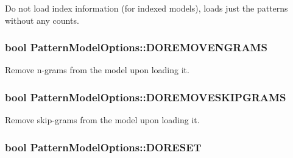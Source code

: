 Do not load index information (for indexed models), loads just the patterns without any counts. 

\hypertarget{classPatternModelOptions_a4ded839cdeb4f4191896d074ef45cf6e}{}
\subsubsection[{D\+O\+R\+E\+M\+O\+V\+E\+N\+G\+R\+A\+M\+S}]{\setlength{\rightskip}{0pt plus 5cm}bool Pattern\+Model\+Options\+::\+D\+O\+R\+E\+M\+O\+V\+E\+N\+G\+R\+A\+M\+S}\label{classPatternModelOptions_a4ded839cdeb4f4191896d074ef45cf6e}


Remove n-\/grams from the model upon loading it. 

\hypertarget{classPatternModelOptions_a88eb47abf2e38a2afac00e8cb9a7a869}{}
\subsubsection[{D\+O\+R\+E\+M\+O\+V\+E\+S\+K\+I\+P\+G\+R\+A\+M\+S}]{\setlength{\rightskip}{0pt plus 5cm}bool Pattern\+Model\+Options\+::\+D\+O\+R\+E\+M\+O\+V\+E\+S\+K\+I\+P\+G\+R\+A\+M\+S}\label{classPatternModelOptions_a88eb47abf2e38a2afac00e8cb9a7a869}


Remove skip-\/grams from the model upon loading it. 

\hypertarget{classPatternModelOptions_a52b76b6c81b7666c997ca05bc1df7e97}{}
\subsubsection[{D\+O\+R\+E\+S\+E\+T}]{\setlength{\rightskip}{0pt plus 5cm}bool Pattern\+Model\+Options\+::\+D\+O\+R\+E\+S\+E\+T}\label{classPatternModelOptions_a52b76b6c81b7666c997ca05bc1df7e97}


